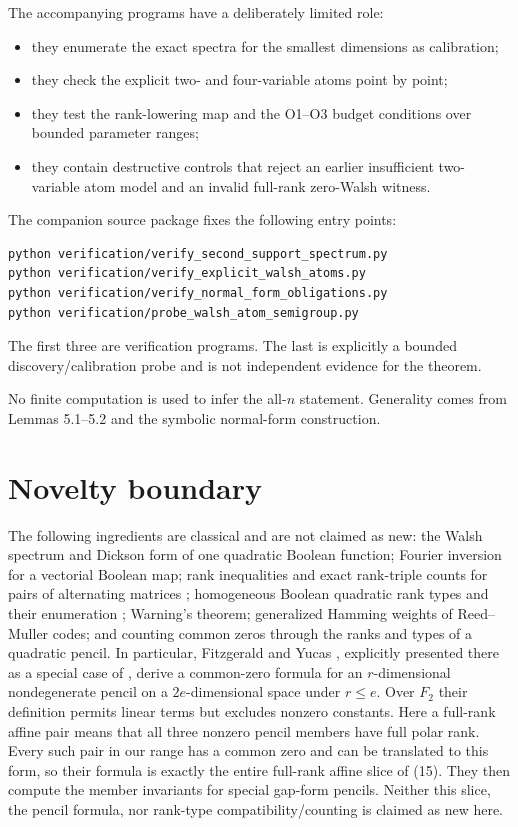 \documentclass[11pt]{article}
\theoremstyle{remark}
\begin{document}
The accompanying programs have a deliberately limited role:

\begin{itemize}
\item they enumerate the exact spectra for the smallest dimensions as calibration;
\item they check the explicit two- and four-variable atoms point by point;
\item they test the rank-lowering map and the O1--O3 budget conditions over bounded parameter ranges;
\item they contain destructive controls that reject an earlier insufficient two-variable atom model and an invalid full-rank zero-Walsh witness.
\end{itemize}

The companion source package fixes the following entry points:

\begin{verbatim}
python verification/verify_second_support_spectrum.py
python verification/verify_explicit_walsh_atoms.py
python verification/verify_normal_form_obligations.py
python verification/probe_walsh_atom_semigroup.py
\end{verbatim}

The first three are verification programs. The last is explicitly a bounded discovery/calibration probe and is not independent evidence for the theorem.

No finite computation is used to infer the all-$n$ statement. Generality comes from Lemmas 5.1--5.2 and the symbolic normal-form construction.
\section{Novelty boundary}

The following ingredients are classical and are not claimed as new: the Walsh spectrum and Dickson form of one quadratic Boolean function; Fourier inversion for a vectorial Boolean map; rank inequalities and exact rank-triple counts for pairs of alternating matrices \cite{ref11}; homogeneous Boolean quadratic rank types and their enumeration \cite{ref12}; Warning's theorem; generalized Hamming weights of Reed--Muller codes; and counting common zeros through the ranks and types of a quadratic pencil. In particular, Fitzgerald and Yucas \cite[Theorem 2]{ref10}, explicitly presented there as a special case of \cite[Theorem 3.6]{ref7}, derive a common-zero formula for an $r$-dimensional nondegenerate pencil on a $2e$-dimensional space under $r\le e$. Over $F_2$ their definition permits linear terms but excludes nonzero constants. Here a full-rank affine pair means that all three nonzero pencil members have full polar rank. Every such pair in our range has a common zero and can be translated to this form, so their formula is exactly the entire full-rank affine slice of (15). They then compute the member invariants for special gap-form pencils. Neither this slice, the pencil formula, nor rank-type compatibility/counting is claimed as new here.
\end{document}

